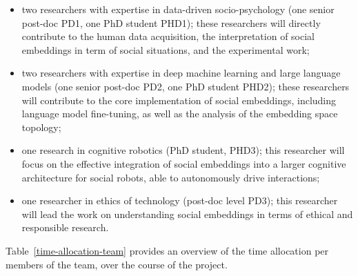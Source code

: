 \begin{itemize}

    \item  two researchers with expertise in data-driven
        socio-psychology (one senior post-doc PD1, one PhD student PHD1); these
        researchers will directly contribute to the human data acquisition,
        the interpretation of social embeddings in term of social situations,
        and the experimental work;

    \item two researchers with expertise in deep machine learning and large
        language models (one senior post-doc PD2, one PhD student PHD2); these
        researchers will contribute to the core implementation of social
        embeddings, including language model fine-tuning, as well as the
        analysis of the embedding space topology;

    \item one research in cognitive robotics (PhD student, PHD3); this
        researcher will focus on the effective integration of social
        embeddings into a larger cognitive architecture for social robots, able
        to autonomously drive interactions;

    \item one researcher in ethics of technology (post-doc
        level PD3); this researcher will lead the work on understanding social
        embeddings in terms of ethical and responsible research.
\end{itemize}

Table~\ref{time-allocation-team} provides an overview of the time allocation per
members of the team, over the course of the project.


